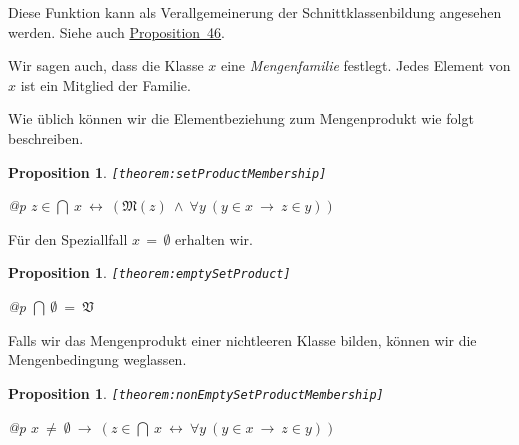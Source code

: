 \documentclass[a4paper,german,10pt,twoside]{book}
\newtheorem{prop}[thm]{Proposition}
\theoremstyle{definition}
\theoremstyle{remark}
\begin{document}
Diese Funktion kann als Verallgemeinerung der Schnittklassenbildung angesehen werden.
Siehe auch \hyperlink{theorem:setPairSetSumProduct}{Proposition~46}.

\par
Wir sagen auch, dass die Klasse $x$ eine \emph{Mengenfamilie}
festlegt. Jedes Element von $x$ ist ein Mitglied der Familie.


\par
Wie {\"u}blich k{\"o}nnen wir die Elementbeziehung zum Mengenprodukt wie folgt beschreiben.

\begin{prop}
\label{theorem:setProductMembership} \hypertarget{theorem:setProductMembership}{}
{\tt \tiny [\verb]theorem:setProductMembership]]}
\mbox{}
\begin{longtable}{{@{\extracolsep{\fill}}p{\linewidth}}}
\centering $z \in \bigcap \ x\ \leftrightarrow\ (\mathfrak{M}(z)\ \land\ \forall y\ (y \in x\ \rightarrow\ z \in y))$
\end{longtable}

\end{prop}


\par
F{\"u}r den Speziallfall $x\,=\,\emptyset$ erhalten wir.

\begin{prop}
\label{theorem:emptySetProduct} \hypertarget{theorem:emptySetProduct}{}
{\tt \tiny [\verb]theorem:emptySetProduct]]}
\mbox{}
\begin{longtable}{{@{\extracolsep{\fill}}p{\linewidth}}}
\centering $\bigcap \ \emptyset \ = \ \mathfrak{V}$
\end{longtable}

\end{prop}


\par
Falls wir das Mengenprodukt einer nichtleeren Klasse bilden,
k{\"o}nnen wir die Mengenbedingung weglassen.

\begin{prop}
\label{theorem:nonEmptySetProductMembership} \hypertarget{theorem:nonEmptySetProductMembership}{}
{\tt \tiny [\verb]theorem:nonEmptySetProductMembership]]}
\mbox{}
\begin{longtable}{{@{\extracolsep{\fill}}p{\linewidth}}}
\centering $x \ \neq \ \emptyset\ \rightarrow\ (z \in \bigcap \ x\ \leftrightarrow\ \forall y\ (y \in x\ \rightarrow\ z \in y))$
\end{longtable}

\end{prop}
\end{document}
